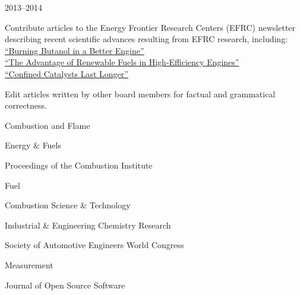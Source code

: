 \begin{lonelist}
\item[]  \hfill 2013--2014\\

\begin{innerlist}
    \item Contribute articles to the Energy Frontier Research Centers (EFRC) newsletter
    describing recent scientific advances resulting from EFRC research, including:\\
    \hspace*{0.25in}\href{http://www.energyfrontier.us/newsletter/201210/burning-butanol-better-engine}
    {``Burning Butanol in a Better Engine''}\\
    \hspace*{0.25in}\href{http://www.energyfrontier.us/newsletter/201401/advantage-renewable-fuels-high-efficiency-engines}
    {``The Advantage of Renewable Fuels in High-Efficiency Engines''}\\
    \hspace*{0.25in}\href{http://www.energyfrontier.us/newsletter/201404/confined-catalysts-last-longer}
    {``Confined Catalysts Last Longer''}
    \item Edit articles written by other board members for factual and grammatical
    correctness.
\end{innerlist}

\item[] 
   \begin{innerlist}
       \item Combustion and Flame
       \item Energy \& Fuels
       \item Proceedings of the Combustion Institute
       \item Fuel
       \item Combustion Science \& Technology
       \item Industrial \& Engineering Chemistry Research
       \item Society of Automotive Engineers World Congress
       \item Measurement
       \item Journal of Open Source Software
   \end{innerlist}

\end{lonelist}

